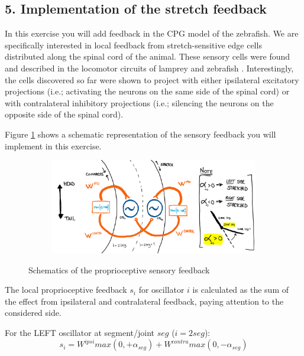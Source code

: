 \documentclass{cmc}
\begin{document}
\subsection*{5. Implementation of the stretch feedback} \label{subsec:wavecontroller}
In this exercise you will add feedback in the CPG model of the zebrafish. We are specifically interested in local feedback from stretch-sensitive edge
cells distributed along the spinal cord of the animal. These sensory cells were found and described in the locomotor circuits of lamprey \cite{grillner1984edge} and zebrafish \cite{picton_spinal_2021}. Interestingly, the cells discovered so far were shown to project with either ipsilateral excitatory projections (i.e.; activating the neurons on the same side of the spinal cord) or with contralateral inhibitory projections (i.e.; silencing the neurons on the opposite side of the spinal cord).

Figure \ref{fig:cpg_scheme} shows a schematic representation of the sensory feedback you will implement in this exercise.

\begin{figure}[H]%
  \centering
  \begin{subfigure}[b]{\textwidth}
    {\includegraphics[width=\textwidth]{figures/CPG_scheme.png}}
  \end{subfigure}
  \caption{\label{fig:cpg_scheme} Schematics of the proprioceptive sensory feedback}
\end{figure}


The local proprioceptive feedback $s_i$ for oscillator $i$ is calculated as the sum of the effect
from ipsilateral and contralateral feedback, paying attention to the considered side.

For the LEFT oscillator at segment/joint $seg$ ($i = 2seg$):
\begin{equation}
  \label{eq:stot_left}
 s_i = W^{ipsi}max(0, +\alpha_{seg}) + W^{contra}max(0, -\alpha_{seg})
\end{equation}
\end{document}
